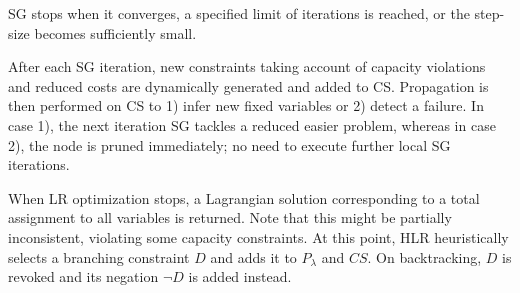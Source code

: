 SG stops when it converges, a specified limit of iterations is reached, or the step-size becomes sufficiently small.

After each SG iteration, new constraints taking account of capacity violations and reduced costs are dynamically generated and added to CS. Propagation is then performed on CS to 1) infer new fixed 
variables or 2) detect a failure. In case 1), the next iteration SG tackles a reduced easier problem, whereas in case 2), the node is pruned immediately; no need to execute further local SG iterations.

When LR optimization stops, a Lagrangian solution corresponding to a total assignment to all variables is returned. Note that this might be partially inconsistent, violating some capacity constraints.
At this point, HLR heuristically selects a branching constraint $D$ and adds it to $P_\lambda$ and $CS$. On backtracking, $D$ is revoked and its negation $\neg D$ is added instead. 


